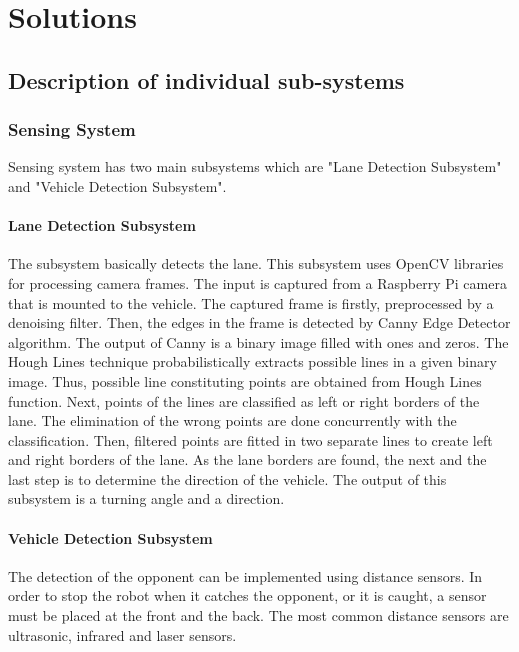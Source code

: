 \documentclass[a4paper,12pt]{article}
\begin{document}
\section{Solutions}

	\subsection{Description of individual sub-systems}

	\subsubsection{Sensing System}

		Sensing system has two main subsystems which are "Lane Detection Subsystem" and "Vehicle Detection Subsystem".
		
		\paragraph{Lane Detection Subsystem}
			The subsystem basically detects the lane. This subsystem uses OpenCV libraries for processing camera frames. The input is captured from a Raspberry Pi camera that is mounted to the vehicle. The captured frame is firstly, preprocessed by a denoising filter. Then, the edges in the frame is detected by Canny Edge Detector algorithm. The output of Canny is a binary image filled with ones and zeros. The Hough Lines technique probabilistically extracts possible lines in a given binary image. Thus, possible line constituting points are obtained from Hough Lines function. Next, points of the lines are classified as left or right borders of the lane. The elimination of the wrong points are done concurrently with the classification. Then, filtered points are fitted in two separate lines to create left and right borders of the lane. As the lane borders are found, the next and the last step is to determine the direction of the vehicle. The output of this subsystem is a turning angle and a direction.

		\paragraph{Vehicle Detection Subsystem}
			The detection of the opponent can be implemented using distance sensors. In order to stop the robot when it catches the opponent, or it is caught, a sensor must be placed at the front and the back. The most common distance sensors are ultrasonic, infrared and laser sensors. 
\end{document}
